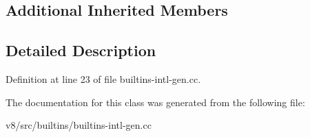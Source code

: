 \subsection*{Additional Inherited Members}


\subsection{Detailed Description}


Definition at line 23 of file builtins-\/intl-\/gen.\+cc.



The documentation for this class was generated from the following file\+:\begin{DoxyCompactItemize}
\item 
v8/src/builtins/builtins-\/intl-\/gen.\+cc\end{DoxyCompactItemize}
